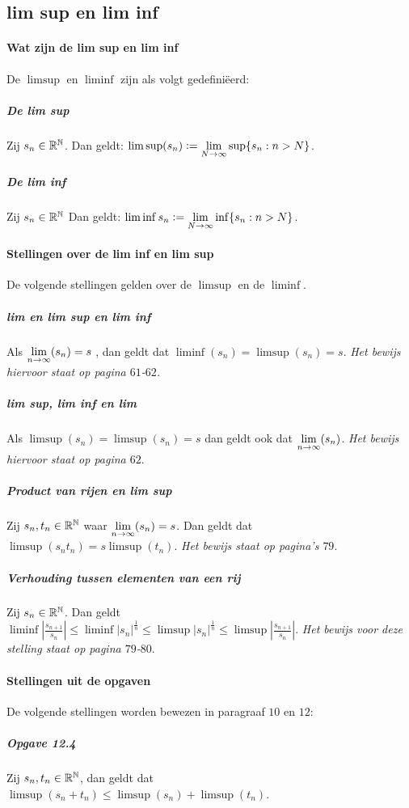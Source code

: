 \subsection{lim sup en lim inf}

\paragraph{Wat zijn de lim sup en lim inf} De $\limsup$ en $\liminf$ zijn als volgt gedefiniëerd:

\subparagraph{De lim sup} Zij $s_{n}\in\mathbb{R}^{\mathbb{N}}$. Dan geldt: $\limsup(s_{n})\vcentcolon=\underset{N\to\infty}{\text{lim}}\sup\{s_{n}:n>N\}$.

\subparagraph{De lim inf} Zij $s_{n}\in\mathbb{R}^{\mathbb{N}}$ Dan geldt: $\liminf{s_{n}}\vcentcolon=\underset{N\to\infty}{\text{lim}}\inf\{s_{n}:n>N\}$.

\paragraph{Stellingen over de lim inf en lim sup} De volgende stellingen gelden over de $\limsup$ en de $\liminf$.

\subparagraph{lim en lim sup en lim inf} Als $\underset{n\to\infty}{\text{lim}}(s_{n}) = s$ , dan geldt dat $\liminf(s_{n})=\limsup(s_{n})=s$. \textit{Het bewijs hiervoor staat op pagina $61$-$62$.}

\subparagraph{lim sup, lim inf en lim} Als $\limsup(s_{n})=\limsup(s_{n})=s$ dan geldt ook dat $\underset{n\to\infty}{\text{lim}}(s_{n})$. \textit{Het bewijs hiervoor staat op pagina $62$}.

\subparagraph{Product van rijen en lim sup} Zij $s_{n},t_{n}\in\mathbb{R}^{\mathbb{N}}$ waar $\underset{n\to\infty}{\text{lim}}(s_{n})=s$. Dan geldt dat\\$\limsup(s_{n}t_{n})=s\limsup(t_{n})$. \textit{Het bewijs staat op pagina's $79$}.

\subparagraph{Verhouding tussen elementen van een rij} Zij $s_{n}\in\mathbb{R}^{\mathbb{N}}$. Dan geldt\\ $\liminf|\frac{s_{n+1}}{s_{n}}|\leq\liminf|s_{n}|^{\frac{1}{n}}\leq\limsup|s_{n}|^{\frac{1}{n}}\leq\limsup|\frac{s_{n+1}}{s_{n}}|$. \textit{Het bewijs voor deze stelling staat op pagina $79$-$80$}.

\paragraph{Stellingen uit de opgaven} De volgende stellingen worden bewezen in paragraaf $10$ en $12$:

\subparagraph{Opgave 12.4} Zij $s_{n},t_{n}\in\mathbb{R}^{\mathbb{N}}$, dan geldt dat $\limsup(s_{n}+t_{n})\leq\limsup(s_{n})+\limsup(t_{n})$.

